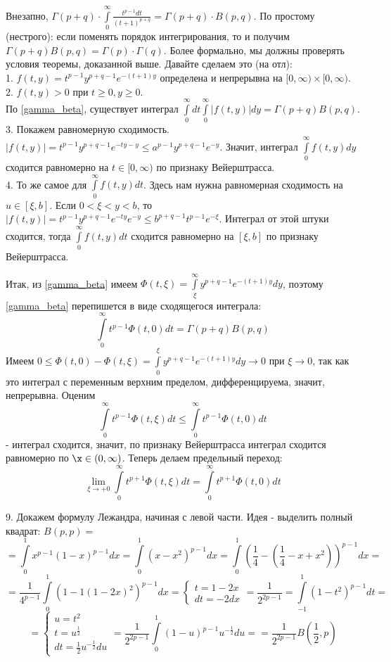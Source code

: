 Внезапно, 
$\Gamma(p+q)\cdot \int\limits_{0}^{\infty} \frac{t^{p-1}dt}{(t+1)^{p+q}}=
\Gamma(p+q)\cdot B(p,q)$. По простому (нестрого): если поменять 
порядок интегрирования, то и получим $\Gamma(p+q)B(p,q)=
\Gamma(p)\cdot \Gamma(q)$. Более формально, мы должны проверять условия 
теоремы, доказанной выше. Давайте сделаем это (на отл):\\
1. $f(t,y)=t^{p-1}y^{p+q-1}e^{-(t+1)y}$ определена и непрерывна на 
$[0,\infty)\times [0,\infty)$.\\
2. $f(t,y)>0$ при  $t\geqslant 0,y\geqslant 0$.\\
По \ref{gamma_beta}, существует интеграл $\int\limits_{0}^{\infty}
dt \int\limits_{0}^{\infty}|f(t,y)|dy=\Gamma(p+q)B(p,q)$.
3. Покажем равномерную сходимость. $|f(t,y)|=t^{p-1}y^{p+q-1}
e^{-ty-y}\leqslant a^{p-1}y^{p+q-1}e^{-y}$. Значит, интеграл 
$\int\limits_{0}^{\infty}f(t,y)dy$ сходится равномерно на $t\in [0,\infty)$
по признаку Вейерштрасса. \\
4. То же самое для $\int\limits_{0}^{\infty}f(t,y)dt$. Здесь
нам нужна равномерная сходимость на $u\in [\xi,b]$. Если 
$0<\xi<y<b$, то  $|f(t,y)|=t^{p-1}y^{p+q-1}e^{-ty}e^{-y}\leqslant 
b^{p+q-1}t^{p-1}e^{-\xi}$. Интеграл от этой штуки сходится, тогда
$\int\limits_{0}^{\infty}f(t,y)dt$ сходится равномерно на $[\xi,b]$ по 
признаку Вейерштрасса. 

Итак, из \ref{gamma_beta} имеем  $\Phi(t,\xi)=\int\limits_{\xi}^{\infty} 
y^{p+q-1}e^{-(t+1)y}dy$, поэтому \ref{gamma_beta} перепишется в виде
сходящегося интеграла:
$$\int\limits_{0}^{\infty}t^{p-1}\Phi(t,0)dt=\Gamma(p+q)B(p,q)$$ 
Имеем $0\leqslant \Phi(t,0)-\Phi(t,\xi)=
\int\limits_{0}^{\xi}y^{p+q-1}e^{-(t+1)y}dy\to 0$ при $\xi\to 0$,
так как это интеграл с переменным верхним пределом, дифференцируема, 
значит, непрерывна. Оценим
$$\int\limits_{0}^{\infty}t^{p-1}\Phi(t,\xi)dt\leqslant 
\int\limits_{0}^{\infty} t^{p-1}\Phi(t,0)dt$$
- интеграл сходится, значит, по признаку Вейерштрасса интеграл сходится
равномерно по $\x \in (0,\infty)$. Теперь делаем предельный переход:
$$\lim\limits_{\xi \to +0}\int\limits_{0}^{\infty}t^{p+1}\Phi(t,\xi)dt
=\int\limits_{0}^{\infty}t^{p+1}\Phi(t,0)dt$$

9. Докажем формулу Лежандра, начиная с левой части. Идея - 
выделить полный квадрат: $B(p,p)=$
$$=\int\limits_{0}^{1}x^{p-1}(1-x)^{p-1}dx=\int\limits_{0}^{1}
(x-x^2)^{p-1}dx=\int\limits_{0}^{1}\left( \frac{1}{4}-
\left( \frac{1}{4}-x+x^2 \right) \right)^{p-1}dx=$$
$$=\frac{1}{4^{p-1}}\int\limits_{0}^{1} (1-1(1-2x)^2)^{p-1}dx=
\begin{cases}t=1-2x\\dt=-2dx\end{cases}=\frac{1}{2^{2p-1}}=
\int\limits_{-1}^{1} (1-t^2)^{p-1}dt=
$$
$$=\begin{cases}
    u=t^2\\t=u^{\frac{1}{2}}\\dt=\frac{1}{2}u^{-\frac{1}{2}}du\end{cases}=
    \frac{1}{2^{2p-1}}\int\limits_{0}^{1}(1-u)^{p-1}u^{-\frac{1}{2}}du=
=\frac{1}{2^{2p-1}}B(\frac{1}{2},p)$$ 



